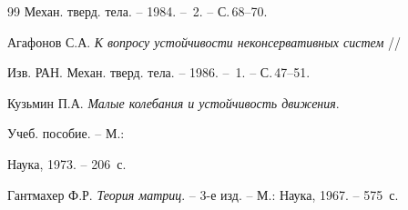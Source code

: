 \begin{thebibliography}{99}
Механ. тверд. тела. -- 1984. -- \No\,2. -- С.\,68--70.




Агафонов С.А. {\em К вопросу устойчивости неконсервативных систем} //


Изв. РАН. Механ. тверд. тела. -- 1986. -- \No\,1. -- С.\,47--51.




Кузьмин П.А. {\em Малые колебания и устойчивость движения}.


Учеб. пособие. -- М.:


Наука, 1973. -- 206~с.




Гантмахер Ф.Р. {\em Теория матриц}. -- 3-е изд. -- М.: Наука, 1967. -- 575~с.





\end{thebibliography}





\vskip 2cm









































